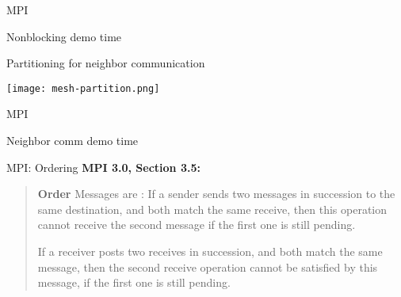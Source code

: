 \documentclass[english,compress]{beamer}
\begin{document}
\begin{frame}{MPI}
  \begin{center}
  \Huge Nonblocking demo time
  \end{center}
\end{frame}
\begin{frame}{Partitioning for neighbor communication}
  \begin{center}
    \texttt{[image: mesh-partition.png]}
  \end{center}
  \uncover<+>{}
\end{frame}
\begin{frame}{MPI}
  \begin{center}
  \Huge Neighbor comm demo time
  \end{center}
\end{frame}
\begin{frame}{MPI: Ordering}
  \uncover<+->{}
  \textbf{MPI 3.0, Section 3.5:}
  \begin{quote}
    \upshape
    \textbf{Order} Messages are : If a
    sender sends two messages in succession to the same destination,
    and both match the same receive, then this operation cannot
    receive the second message if the first one is still pending.

    \bigskip
    If a receiver posts two receives in succession,
    and both match the same message, then the second receive operation
    cannot be satisfied
    by this message, if the first one is still pending.
  \end{quote}
\end{frame}
\end{document}
